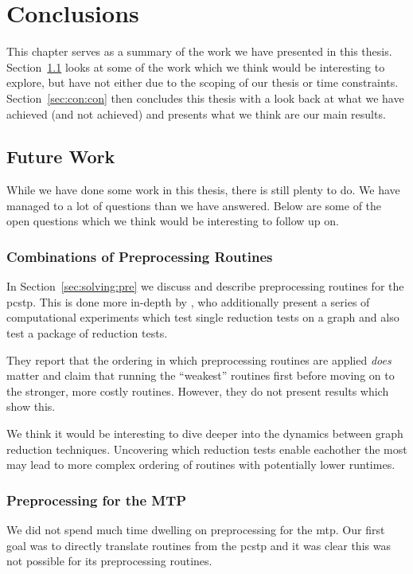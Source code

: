 {}
\chapter{Conclusions}
This chapter serves as a summary of the work we have presented in this thesis.
Section~\ref{sec:con:fut} looks at some of the work which we think would be
interesting to explore, but have not either due to the scoping of our thesis or
time constraints.
Section~\ref{sec:con:con} then concludes this thesis with a look back at what we
have achieved (and not achieved) and presents what we think are our main results.
\section{Future Work}\label{sec:con:fut}
While we have done some work in this thesis, there is still plenty to do. We have
managed to a lot of questions than we have answered. Below are some of the open
questions which we think would be interesting to follow up on.

\subsection{Combinations of Preprocessing Routines}
In Section~\ref{sec:solving:pre} we discuss and describe preprocessing routines for
the \gls{pcstp}. This is done more in-depth by \citet{rehfeldt2016reduction}, who
additionally present a series of computational experiments which test single reduction
tests on a graph and also test a package of reduction tests.

They report that the ordering
in which preprocessing routines are applied \textit{does} matter and claim that running
the ``weakest'' routines first before moving on to the stronger, more costly routines.
However, they do not present results which show this.

We think it would be interesting to dive deeper into the dynamics between graph reduction
techniques. Uncovering which reduction tests enable eachother the most may lead to more
complex ordering of routines with potentially lower runtimes.

\subsection{Preprocessing for the MTP}
We did not spend much time dwelling on preprocessing for the \gls{mtp}. Our first goal was
to directly translate routines from the \gls{pcstp} and it was clear this was not possible
for its preprocessing routines.

